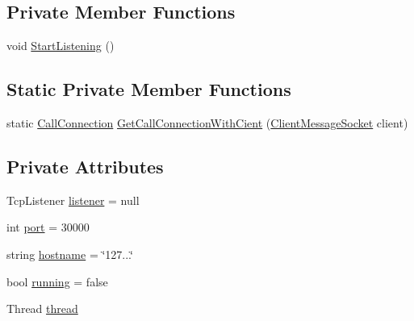 \subsection*{Private Member Functions}
\begin{DoxyCompactItemize}
\item 
void \hyperlink{class_e_l_i_server_1_1_message_socket_manager_ab5d2f61a349046960ae63303ff1c2130}{Start\+Listening} ()
\end{DoxyCompactItemize}
\subsection*{Static Private Member Functions}
\begin{DoxyCompactItemize}
\item 
static \hyperlink{class_e_l_i_server_1_1_call_connection}{Call\+Connection} \hyperlink{class_e_l_i_server_1_1_message_socket_manager_aa9a1bde31e6bb4d0ef01f974a5784d08}{Get\+Call\+Connection\+With\+Cient} (\hyperlink{class_e_l_i_server_1_1_messaging_1_1_client_message_socket}{Client\+Message\+Socket} client)
\end{DoxyCompactItemize}
\subsection*{Private Attributes}
\begin{DoxyCompactItemize}
\item 
Tcp\+Listener \hyperlink{class_e_l_i_server_1_1_message_socket_manager_a0c3b11ce72614567322dc025fd40c1c5}{listener} = null
\item 
int \hyperlink{class_e_l_i_server_1_1_message_socket_manager_af344f11a273d91f2d2c520583f105b95}{port} = 30000
\item 
string \hyperlink{class_e_l_i_server_1_1_message_socket_manager_afe7ddcd6b733f389617621037d713db4}{hostname} = \char`\"{}127...\char`\"{}
\item 
bool \hyperlink{class_e_l_i_server_1_1_message_socket_manager_ae7079918e3fb3c205ee8831f800cd4d9}{running} = false
\item 
Thread \hyperlink{class_e_l_i_server_1_1_message_socket_manager_a2c6114a87afeb4ecb1cbf42daea68df0}{thread}
\end{DoxyCompactItemize}
